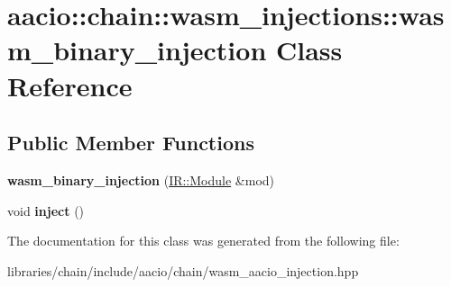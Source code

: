 \hypertarget{classaacio_1_1chain_1_1wasm__injections_1_1wasm__binary__injection}{}\section{aacio\+:\+:chain\+:\+:wasm\+\_\+injections\+:\+:wasm\+\_\+binary\+\_\+injection Class Reference}
\label{classaacio_1_1chain_1_1wasm__injections_1_1wasm__binary__injection}
\subsection*{Public Member Functions}
\begin{DoxyCompactItemize}
\item 
\mbox{\label{classaacio_1_1chain_1_1wasm__injections_1_1wasm__binary__injection_aabb4d323319807edafa70af06e5ba4ed}} 
{\bfseries wasm\+\_\+binary\+\_\+injection} (\mbox{\hyperlink{struct_i_r_1_1_module}{I\+R\+::\+Module}} \&mod)
\item 
\mbox{\label{classaacio_1_1chain_1_1wasm__injections_1_1wasm__binary__injection_a3aed5022ea0ddd59f4f750014d89443f}} 
void {\bfseries inject} ()
\end{DoxyCompactItemize}


The documentation for this class was generated from the following file\+:\begin{DoxyCompactItemize}
\item 
libraries/chain/include/aacio/chain/wasm\+\_\+aacio\+\_\+injection.\+hpp\end{DoxyCompactItemize}
